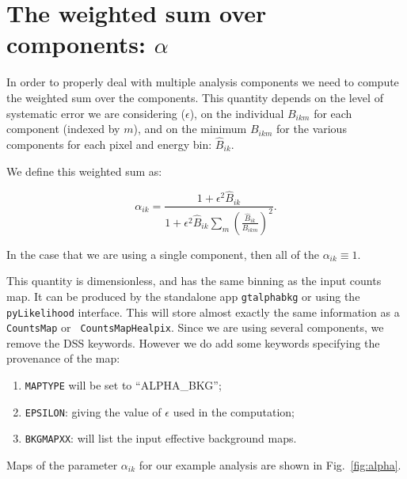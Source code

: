 \documentclass[preprint]{aastex}
\begin{document}
\section{The weighted sum over components: \texorpdfstring{$\alpha$}{alpha}}

In order to properly deal with multiple analysis components we need to
compute the weighted sum over the components.  This quantity depends on
the level of systematic error we are considering ($\epsilon$), on the
individual $B_{ikm}$ for each component (indexed by $m$), and on the
minimum $B_{ikm}$ for the various components for each pixel and energy
bin: $\hat{B}_{ik}$.

We define this weighted sum as:

\begin{equation}
\alpha_{ik} = \frac{1 + \epsilon^2 \hat{B}_{ik}}{1 + \epsilon^2 \hat{B}_{ik} \sum_{m} (\frac{\hat{B}_{ik}}{B_{ikm}})^2 }.
\end{equation}

\noindent In the case that we are using a single component, then all
of the $\alpha_{ik} \equiv 1$.

This quantity is dimensionless, and has the same binning as the input
counts map.  It can be produced by the standalone app {\tt gtalphabkg}
or using the {\tt pyLikelihood} interface.  This will store almost
exactly the same information as a {\tt CountsMap} or {\tt
  CountsMapHealpix}. Since we are using several components, we remove 
the DSS keywords.  However we do add some keywords specifying the
provenance of the map:

\begin{enumerate}
\item{{\tt MAPTYPE} will be set to ``ALPHA\_BKG'';}
\item{{\tt EPSILON}: giving the value of $\epsilon$ used in the computation;}
\item{{\tt BKGMAPXX}: will list the input effective background maps.}    
\end{enumerate}

Maps of the parameter $\alpha_{ik}$ for our example analysis are shown in Fig.~\ref{fig:alpha}.
\end{document}
